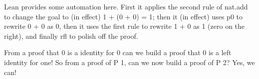 \documentclass[letterpaper,10pt,english]{sphinxmanual}
\begin{document}
\sphinxAtStartPar
Lean provides some automation here. First it
applies the second rule of nat.add to change
the goal to (in effect) 1 + (0 + 0) = 1; then
it (in effect) uses p0 to rewrite 0 + 0 as 0,
then it uses the first rule to rewrite 1 + 0
as 1 (zero on the right), and finally rfl to
polish off the proof.

\sphinxAtStartPar
From a proof that 0 is a  identity for
0 can we build a proof that 0 is a left identity
for one! So from a proof of P 1, can we now build
a proof of P 2? Yes, we can!

\begin{sphinxVerbatim}[commandchars=\\\{\}]
      
 
   
        
          

      
 
       
       
   

      
       
       
   


\end{sphinxVerbatim}
\end{document}
